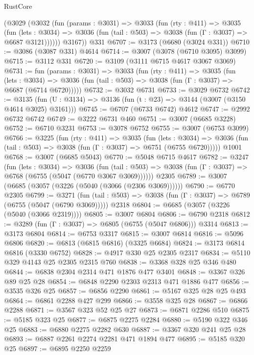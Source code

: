 \begin{lexlean}{RustCore}
\begin{coremodule}
      (@3029
        (@3032
          (fun (params : @3031) =>
          @3033
            (fun (rty : @411) =>
            @3035
              (fun (lets : @3034) =>
              @3036 (fun (tail : @503) => @3038 (fun (Γ : @3037) => @6687 @3121))))))
        @3167))
    @331
@6707 := @3173 (@6680 (@3024 @331))
@6710 := @3086 (@3087 @331) @4614
@6714 := @3007 (@3078 (@6710 @3095) @3099)
@6715 := @3112 @331
@6720 := @3109 (@3111 @6715 @4617 @3067 @3069)
@6731 := fun (params : @3031) =>
  @3033
    (fun (rty : @411) =>
    @3035
      (fun (lets : @3034) =>
      @3036 (fun (tail : @503) => @3038 (fun (Γ : @3037) => @6687 (@6714 @6720)))))
@6732 := @3032 @6731
@6733 := @3029 @6732
@6742 := @3135 (fun (U : @3134) => @3136 (fun (t : @23) => @3144 (@3007 (@3150 @4614 @3025) @3161)))
@6745 := @6707 (@6733 @6742) @4612
@6747 := @2992 @6732 @6742
@6749 := @3222 @6731 @460
@6751 := @3007 (@6685 @3228)
@6752 := @6710 @3231
@6753 := @3078 @6752
@6755 := @3007 (@6753 @3099)
@6766 := @3225
    (fun (rty : @411) =>
    @3035
      (fun (lets : @3034) =>
      @3036 (fun (tail : @503) => @3038 (fun (Γ : @3037) => @6751 (@6755 @6720)))))
    @1001
@6768 := @3007 (@6685 @5043)
@6770 := @5048 @6715 @4617
@6782 := @3247
    (fun (lets : @3034) =>
    @3036
      (fun (tail : @503) => @3038 (fun (Γ : @3037) => @6768 (@6755 (@5047 (@6770 @3067 @3069))))))
    @2305
@6789 := @3007 (@6685 (@3057 (@3226 (@5040 (@3066 (@2306 @3069))))))
@6790 := @6770 @2305
@6799 := @3271
    (fun (tail : @503) => @3038 (fun (Γ : @3037) => @6789 (@6755 (@5047 (@6790 @3069)))))
    @2318
@6804 := @6685 (@3057 (@3226 (@5040 (@3066 @2319))))
@6805 := @3007 @6804
@6806 := @6790 @2318
@6812 := @3289 (fun (Γ : @3037) => @6805 (@6755 (@5047 @6806))) @3314
@6813 := @3173 @6804
@6814 := @6753 @3317
@6815 := @3007 @6814
@6816 := @5096 @6806
@6820 := @6813 (@6815 @6816) (@3325 @6684)
@6824 := @3173 @6814 @6816 (@3330 @6752)
@6828 := @4917 @330 @25 @2305 @2317
@6834 := @5110 @329 @4143 @25 @2305 @2315 @760
@6838 := @3368 @328 @25 @346 @480
@6844 := @6838 @2304 @2314 @471 @1876 @477 @3401
@6848 := @3367 @326 @89 @25 @28
@6854 := @6848 @2290 @2303 @2313 @471 @1886 @477
@6856 := @3535 @326 @25
@6857 := @6856 @2290
@6861 := @5167 @325 @28 @25 @493
@6864 := @6861 @2288 @427 @299
@6866 := @3558 @325 @28
@6867 := @6866 @2288
@6871 := @3567 @323 @52 @25 @27
@6873 := @6871 @2286 @510
@6875 := @5185 @323 @25
@6877 := @6875 @2275 @2284
@6880 := @5190 @322 @346 @25
@6883 := @6880 @2275 @2282 @630
@6887 := @3367 @320 @241 @25 @28
@6893 := @6887 @2261 @2274 @2281 @471 @1894 @477
@6895 := @5185 @320 @25
@6897 := @6895 @2250 @2259

\end{coremodule}
\end{lexlean}
